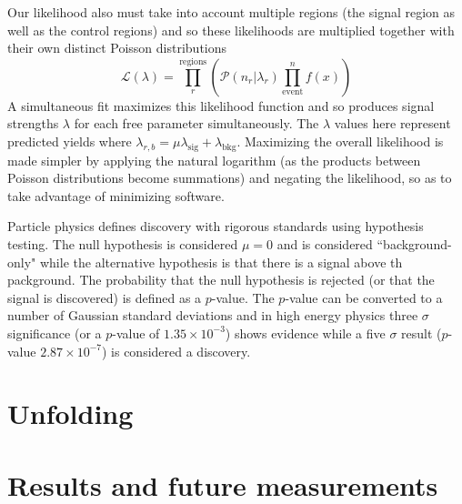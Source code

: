 Our likelihood also must take into account multiple regions (the signal region as well as the control regions) and so these likelihoods are multiplied together with their own distinct Poisson distributions
\begin{equation}
\mathcal{L}(\lambda)=\prod_r^{\text{regions}}(\mathcal{P}(n_r|\lambda_r)\prod_{\text{event}}^n f(x))
\end{equation}
A simultaneous fit maximizes this likelihood function and so produces signal strengths $\lambda$ for each free parameter simultaneously. The $\lambda$ values here represent predicted yields where $\lambda_{r,b} = \mu \lambda_{\text{sig}}+\lambda_{\text{bkg}}$. Maximizing the overall likelihood is made simpler by applying the natural logarithm (as the products between Poisson distributions become summations) and negating the likelihood, so as to take advantage of minimizing software.  

Particle physics defines discovery with rigorous standards using hypothesis testing. The null hypothesis is considered $\mu=0$ and is considered ``background-only" while the alternative hypothesis is that there is a signal above th packground. The probability that the null hypothesis is rejected (or that the signal is discovered) is defined as a $p$-value. The $p$-value can be converted to a number of Gaussian standard deviations and in high energy physics three $\sigma$ significance (or a $p$-value of $1.35 \times 10^{-3}$) shows evidence while a five $\sigma$ result ($p$-value $2.87\times10^{-7}$) is considered a discovery.

\section{Unfolding}
\section{Results and future measurements}
